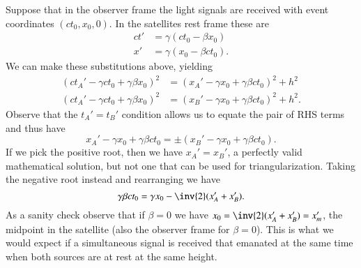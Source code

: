 {Suppose that in the observer frame the light signals are received with event coordinates \((c t_0, x_0, 0)\).  In the satellites rest frame these are
%
\begin{equation}\label{eqn:relElectroDynProblemSet1:1240}
\begin{aligned}
ct' &= \gamma ( c t_0 - \beta x_0 ) \\
x' &= \gamma ( x_0 - \beta c t_0 ).
\end{aligned}
\end{equation}
%
We can make these substitutions above, yielding
%
\begin{equation}\label{eqn:relElectroDynProblemSet1:1260}
\begin{aligned}
( c t_A' - \gamma c t_0 + \gamma \beta x_0)^2 &= (x_A' - \gamma x_0 + \gamma \beta c t_0 )^2 + h^2 \\
( c t_A' - \gamma c t_0 + \gamma \beta x_0)^2 &= (x_B' - \gamma x_0 + \gamma \beta c t_0 )^2 + h^2.
\end{aligned}
\end{equation}
%
Observe that the \(t_A' = t_B'\) condition allows us to equate the pair of RHS terms and thus have
%
\begin{equation}\label{eqn:relElectroDynProblemSet1:1280}
x_A' - \gamma x_0 + \gamma \beta c t_0 = \pm (x_B' - \gamma x_0 + \gamma \beta c t_0 ).
\end{equation}
%
If we pick the positive root, then we have \(x_A' = x_B'\), a perfectly valid mathematical solution, but not one that can be used for triangularization.  Taking the negative root instead and rearranging we have
%
\begin{equation}\label{eqn:relElectroDynProblemSet1:1301}
\gamma \beta c t_0 = \gamma x_0 - \inv{2}(x_A' + x_B').
\end{equation}
%
As a sanity check observe that if \(\beta = 0\) we have \(x_0 = \inv{2}(x_A' + x_B') = x_m'\), the midpoint in the satellite (also the observer frame for \(\beta = 0\)).  This is what we would expect if a simultaneous signal is received that emanated at the same time when both sources are at rest at the same height.

}
